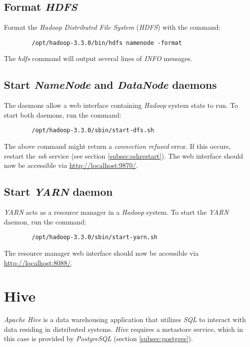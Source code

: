 \documentclass{article}
\begin{document}
    \subsection{Format \emph{HDFS}}
    Format the \emph{Hadoop Distributed File System} (\emph{HDFS}) with the command:
    \begin{verbatim}
        /opt/hadoop-3.3.0/bin/hdfs namenode -format
    \end{verbatim}
    The \emph{hdfs} command will output several lines of \emph{INFO} messages.

    \subsection{Start \emph{NameNode} and \emph{DataNode} daemons}
    The daemons allow a web interface containing \emph{Hadoop} system stats to run. To start both
    daemons, run the command:
    \begin{verbatim}
        /opt/hadoop-3.3.0/sbin/start-dfs.sh
    \end{verbatim}
    The above command might return a \emph{connection refused} error. If this occurs, restart
    the \emph{ssh} service (see section \ref{subsec:sshrestart}). The web interface should now be
    accessible via \url{http://localhost:9870/}.

    \subsection{Start \emph{YARN} daemon}
    \emph{YARN} acts as a resource manager in a \emph{Hadoop} system. To start the \emph{YARN} daemon,
    run the command:
    \begin{verbatim}
        /opt/hadoop-3.3.0/sbin/start-yarn.sh
    \end{verbatim}
    The resource manager web interface should now be accessible via
    \url{http://localhost:8088/}.

\section{Hive}
\emph{Apache Hive} is a data warehousing application that utilizes \emph{SQL} to interact with
data residing in distributed systems. \emph{Hive} requires a metastore service, which in this case
is provided by \emph{PostgreSQL} (section \ref{subsec:postgres}).
\end{document}
